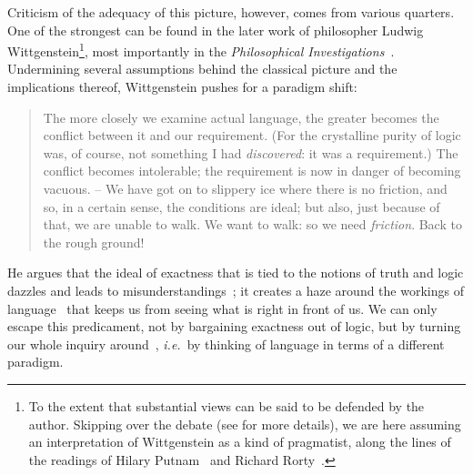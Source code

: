 \documentclass[a4paper]{article}
\begin{document}
Criticism of the adequacy of this picture, however, comes from various quarters.
One of the strongest can be found in the later work of philosopher Ludwig Wittgenstein\footnote{To the extent that substantial views can be said to be defended by the author. Skipping over the debate (see \cite{kahane_wittgenstein_2007} for more details), we are here assuming an interpretation of Wittgenstein as a kind of pragmatist, along the lines of the readings of Hilary Putnam~\parencite*{putnam_pragmatism_1994} and Richard Rorty~\parencite*{rorty_wittgenstein_2007}.}, most importantly in the \emph{Philosophical Investigations}~\parencite*{wittgenstein_philosophical_1953}.
Undermining several assumptions behind the classical picture and the implications thereof, Wittgenstein pushes for a paradigm shift:
\begin{quote}
The more closely we examine actual language, the greater becomes the conflict between it and our requirement.
(For the crystalline purity of logic was, of course, not something I had \emph{discovered}: it was a requirement.)
The conflict becomes intolerable; the requirement is now in danger of becoming vacuous.
-- We have got on to slippery ice where there is no friction, and so, in a certain sense, the conditions are ideal; but also, just because of that, we are unable to walk.
We want to walk: so we need \emph{friction}.
Back to the rough ground!%
~\parencite[\S 107]{wittgenstein_philosophical_1953}
\end{quote}
He argues that the ideal of exactness that is tied to the notions of truth and logic dazzles and leads to misunderstandings~\parencite*[\S 100]{wittgenstein_philosophical_1953}; it creates a haze around the workings of language~\parencite*[\S 5]{wittgenstein_philosophical_1953} that keeps us from seeing what is right in front of us.
We can only escape this predicament, not by bargaining exactness out of logic, but by turning our whole inquiry around~\parencite*[\S 108]{wittgenstein_philosophical_1953}, \emph{i.e.}~by thinking of language in terms of a different paradigm.
\end{document}
